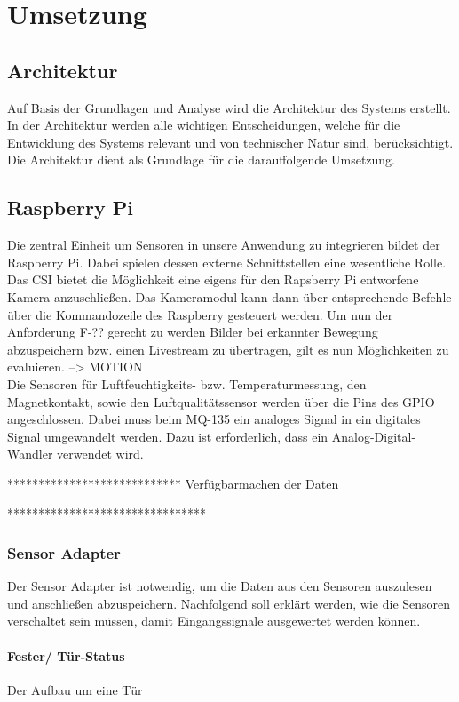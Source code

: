 \chapter{Umsetzung} \label{sec:Umsetzung}

\section{Architektur}
Auf Basis der Grundlagen und Analyse wird die Architektur des Systems erstellt.
In der Architektur werden alle wichtigen Entscheidungen, welche für die
Entwicklung des Systems relevant und von technischer Natur sind, berücksichtigt. Die Architektur dient als Grundlage für die darauffolgende Umsetzung.

\section{Raspberry Pi}
Die zentral Einheit um Sensoren in unsere Anwendung zu integrieren bildet der Raspberry Pi. Dabei spielen dessen externe Schnittstellen eine wesentliche Rolle. \\Das \acf{CSI}
bietet die Möglichkeit eine eigens für den Rapsberry Pi entworfene Kamera anzuschließen. Das Kameramodul kann dann über entsprechende Befehle über die Kommandozeile des Raspberry gesteuert werden. Um nun der Anforderung F-?? gerecht zu werden Bilder bei erkannter Bewegung abzuspeichern bzw. einen Livestream zu übertragen, gilt es nun Möglichkeiten zu evaluieren. 
--> MOTION
\\Die Sensoren für Luftfeuchtigkeits- bzw. Temperaturmessung, den Magnetkontakt, sowie den Luftqualitätssensor werden über die Pins des \ac{GPIO} angeschlossen. Dabei muss beim MQ-135 ein analoges Signal in ein digitales Signal umgewandelt werden. Dazu ist erforderlich, dass ein Analog-Digital-Wandler verwendet wird. 

****************************
Verfügbarmachen der Daten 


********************************

\subsection{Sensor Adapter}
Der Sensor Adapter ist notwendig, um die Daten aus den Sensoren auszulesen und anschließen abzuspeichern. Nachfolgend soll erklärt werden, wie die Sensoren verschaltet sein müssen, damit Eingangssignale ausgewertet werden können. 

\subsubsection{Fester/ Tür-Status}
Der Aufbau um eine Tür 

